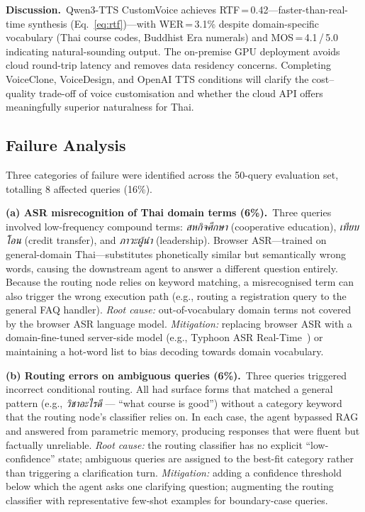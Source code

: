 \documentclass[10pt, a4paper, twocolumn]{article}
\begin{document}
\noindent\textbf{Discussion.}\
Qwen3-TTS CustomVoice achieves RTF\,=\,0.42---faster-than-real-time
synthesis (Eq.~\ref{eq:rtf})---with WER\,=\,3.1\% despite
domain-specific vocabulary (Thai course codes, Buddhist Era numerals)
and MOS\,=\,4.1\,/\,5.0 indicating natural-sounding output.
The on-premise GPU deployment avoids cloud round-trip latency and
removes data residency concerns.
Completing VoiceClone, VoiceDesign, and OpenAI TTS conditions will
clarify the cost--quality trade-off of voice customisation and whether
the cloud API offers meaningfully superior naturalness for Thai.

\subsection{Failure Analysis}
\label{sec:failure}

Three categories of failure were identified across the 50-query
evaluation set, totalling 8 affected queries (16\%).

\noindent\textbf{(a) ASR misrecognition of Thai domain terms (6\%).}\
Three queries involved low-frequency compound terms:
\textit{สหกิจศึกษา} (cooperative education),
\textit{เทียบโอน} (credit transfer), and
\textit{ภาวะผู้นำ} (leadership).
Browser ASR---trained on general-domain Thai---substitutes phonetically
similar but semantically wrong words, causing the downstream agent to
answer a different question entirely.
Because the routing node relies on keyword matching, a misrecognised
term can also trigger the wrong execution path (e.g., routing a
registration query to the general FAQ handler).
\textit{Root cause:} out-of-vocabulary domain terms not covered by the
browser ASR language model.
\textit{Mitigation:} replacing browser ASR with a domain-fine-tuned
server-side model (e.g., Typhoon ASR Real-Time~\cite{sirichotedumrong2026typhoonasr})
or maintaining a hot-word list to bias decoding towards domain
vocabulary.

\noindent\textbf{(b) Routing errors on ambiguous queries (6\%).}\
Three queries triggered incorrect conditional routing.
All had surface forms that matched a general pattern (e.g.,
\textit{วิชาอะไรดี} --- ``what course is good'') without a
category keyword that the routing node's classifier relies on.
In each case, the agent bypassed RAG and answered from parametric
memory, producing responses that were fluent but factually unreliable.
\textit{Root cause:} the routing classifier has no explicit
``low-confidence'' state; ambiguous queries are assigned to the best-fit
category rather than triggering a clarification turn.
\textit{Mitigation:} adding a confidence threshold below which the
agent asks one clarifying question; augmenting the routing classifier
with representative few-shot examples for boundary-case queries.
\end{document}
